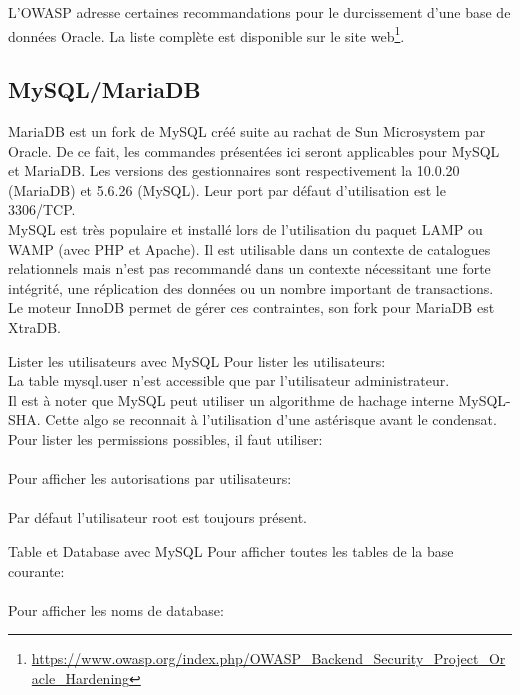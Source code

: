 \documentclass[twoside,a4paper,12pt,titlepage]{book}
\begin{document}
L'OWASP adresse certaines recommandations pour le durcissement d'une base de données Oracle. La liste complète est disponible sur le site web\footnote{\url{https://www.owasp.org/index.php/OWASP_Backend_Security_Project_Oracle_Hardening}}.

\subsection{MySQL/MariaDB}
MariaDB est un fork de MySQL créé suite au rachat de Sun Microsystem par Oracle. De ce fait, les commandes présentées ici seront applicables pour MySQL et MariaDB. Les versions des gestionnaires sont respectivement la 10.0.20 (MariaDB) et 5.6.26 (MySQL). Leur port par défaut d'utilisation est le 3306/TCP.\\
MySQL est très populaire et installé lors de l'utilisation du paquet LAMP ou WAMP (avec PHP et Apache). Il est utilisable dans un contexte de catalogues relationnels mais n'est pas recommandé dans un contexte nécessitant une forte intégrité, une réplication des données ou un nombre important de transactions. Le moteur InnoDB permet de gérer ces contraintes, son fork pour MariaDB est XtraDB.

\begin{FlagConsole}{Lister les utilisateurs avec MySQL}
	Pour lister les utilisateurs:
	\\
	La table mysql.user n'est accessible que par l'utilisateur administrateur.\\
	Il est à noter que MySQL peut utiliser un algorithme de hachage interne MySQL-SHA. Cette algo se reconnait à l'utilisation d'une astérisque avant le condensat.\tcblower
	Pour lister les permissions possibles, il faut utiliser: \\
	\\
	Pour afficher les autorisations par utilisateurs:\\
	\\
	Par défaut l'utilisateur root est toujours présent.
\end{FlagConsole}
\begin{FlagConsole}{Table et Database avec MySQL}
	Pour afficher toutes les tables de la base courante:\\
	\\
	Pour afficher les noms de database:\\
\end{FlagConsole}
\end{document}
